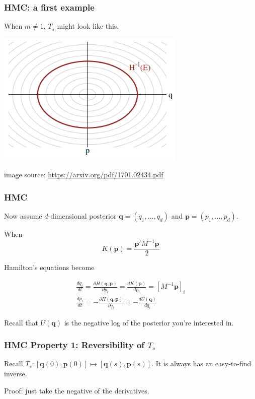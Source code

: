 \documentclass{beamer}
\begin{document}
\begin{frame}
\frametitle{HMC: a first example}

When $m \neq 1$, $T_s$ might look like this. 
\begin{center}
\includegraphics[width=90mm]{level_sets.png}
\end{center}
image source: \url{https://arxiv.org/pdf/1701.02434.pdf}

\end{frame}

\begin{frame}
\frametitle{HMC}

Now assume $d$-dimensional posterior $\mathbf{q} = (q_1, \ldots, q_d)$ and $\mathbf{p} = (p_1, \ldots, p_d)$.
\newline

When
$$
K(\mathbf{p}) = \frac{\mathbf{p}'M^{-1}\mathbf{p}}{2} 
$$

Hamilton's equations become

\begin{gather}
\frac{dq_i}{dt} = \frac{\partial H(\mathbf{q},\mathbf{p})}{\partial p_i} =  \frac{d K(\mathbf{p}) }{d p_i} = [M^{-1}\mathbf{p}]_i  \\
\frac{dp_i}{dt} = -\frac{\partial H(\mathbf{q},\mathbf{p})}{\partial q_i} = -\frac{d U(\mathbf{q})}{d q_i} 
\end{gather}

Recall that $U(\mathbf{q})$ is the negative log of the posterior you're interested in.
\end{frame}


\begin{frame}
\frametitle{HMC Property 1: Reversibility of $T_s$}

Recall  $T_s: [\mathbf{q}(0), \mathbf{p}(0)] \mapsto [\mathbf{q}(s), \mathbf{p}(s)]$. It is always has an easy-to-find inverse.
\newline

Proof: just take the negative of the derivatives.


\end{frame}
\end{document}
